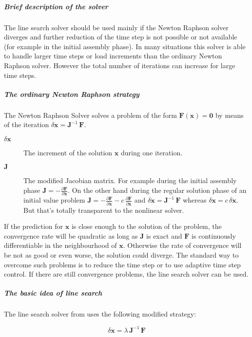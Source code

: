 \subparagraph{Brief description of the solver}
The line search solver should be used mainly if the Newton Raphson solver diverges and further reduction of the time step is not possible or not available (for example in the initial assembly phase). In many situations this solver is able to handle larger time steps or load increments than the ordinary Newton Raphson solver. However the total number of iterations can increase for large time steps.

\subparagraph{The ordinary Newton Raphson strategy}
The Newton Raphson Solver solves a problem of the form $\boldsymbol{F}\left(\boldsymbol{x}\right)=\boldsymbol{0}$ by means of the iteration $\delta\boldsymbol{x}=\boldsymbol{J}^{-1}\,\boldsymbol{F}$.

\begin{description}
\item[$\delta\boldsymbol{x}$] The increment of the solution $\boldsymbol{x}$ during one iteration.
\item[$\boldsymbol{J}$] The modified Jacobian matrix. 
For example during the initial assembly phase $\boldsymbol{J}=-\frac{\partial \boldsymbol{F}}{\partial \boldsymbol{x}}$. 
On the other hand during the regular solution phase of an initial value problem $\boldsymbol{J}=-\frac{\partial \boldsymbol{F}}{\partial \dot{\boldsymbol{x}}}-c\,\frac{\partial \boldsymbol{F}}{\partial \boldsymbol{x}}$
and $\delta\dot{\boldsymbol{x}}=\boldsymbol{J}^{-1}\,\boldsymbol{F}$ whereas $\delta\boldsymbol{x}=c\,\delta\dot{\boldsymbol{x}}$. But that's totally transparent to the nonlinear solver.
\end{description}

If the prediction for $\boldsymbol{x}$ is close enough to the solution of the problem, the convergence rate will be quadratic as long as $\boldsymbol{J}$ is exact and $\boldsymbol{F}$ is continuously differentiable in the neighbourhood of $\boldsymbol{x}$. Otherwise the rate of convergence will be not as good or even worse, the solution could diverge. The standard way to overcome such problems is to reduce the time step or to use adaptive time step control. If there are still convergence problems, the line search solver can be used.

\subparagraph{The basic idea of line search}
The line search solver from \cite{NUMERICAL-RECIPES-IN-C} uses the following modified strategy:

\begin{equation}
\delta\boldsymbol{x}=\lambda\,\boldsymbol{J}^{-1}\,\boldsymbol{F}
\end{equation}

